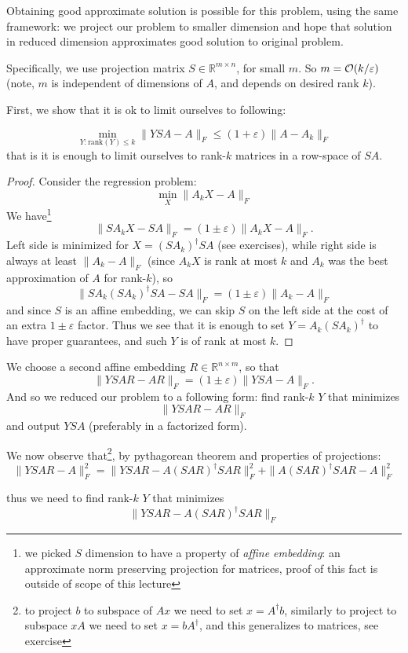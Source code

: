 \documentclass[11pt]{article}
\begin{document}
Obtaining good approximate solution is possible for this problem, using the same framework: we project our problem to smaller dimension and hope that solution in reduced dimension approximates good solution to original problem.

Specifically, we use projection matrix $S \in \mathbb{R}^{m \times n}$, for small $m$. So $m = \mathcal{O}(k/\varepsilon)$ (note, $m$ is independent of dimensions of $A$, and depends on desired rank $k$). 

First, we show that it is ok to limit ourselves to following:
\begin{theorem}
$$\min_{Y: \textrm{rank}(Y) \le k} \|YSA - A\|_F \le (1+\varepsilon)\|A-A_k\|_F$$
that is it is enough to limit ourselves to rank-$k$ matrices in a row-space of $SA$.
\end{theorem}
\begin{proof}
Consider the regression problem:
$$\min_{X} \|A_k X - A \|_F$$
We have\footnote{we picked $S$ dimension to have a property of \emph{affine embedding}: an approximate norm preserving projection for matrices, proof of this fact is outside of scope of this lecture}
$$\|SA_k X - SA \|_F = (1\pm \varepsilon)\|A_kX - A\|_F.$$
Left side is minimized for $X = (SA_k)^{\dagger} SA$ (see exercises), while right side is always at least $\|A_k - A\|_F$ (since $A_kX$ is rank at most $k$ and $A_k$ was the best approximation of $A$ for rank-$k$), so
$$\|SA_k (SA_k)^{\dagger} SA - SA\|_F = (1\pm \varepsilon) \|A_k - A \|_F$$
and since $S$ is an affine embedding, we can skip $S$ on the left side at the cost of an extra $1\pm\varepsilon$ factor.
Thus we see that it is enough to set $Y = A_k (SA_k)^{\dagger}$ to have proper guarantees, and such $Y$ is of rank at most $k$.
\end{proof}
We choose a second affine embedding $R \in \mathbb{R}^{n \times m}$, so that
$$\|YSAR - AR \|_F = (1\pm \varepsilon)\|YSA - A\|_F.$$
And so we reduced our problem to a following form: find rank-$k$ $Y$ that minimizes
$$\|YSAR - AR\|_F$$
and output $YSA$ (preferably in a factorized form).

We now observe that\footnote{to project $b$ to subspace of $Ax$ we need to set $x = A^{\dagger}b$, similarly to project to subspace $xA$ we need to set $x = bA^{\dagger}$, and this generalizes to matrices, see exercise}, by pythagorean theorem and properties of projections:
$$\|YSAR - A\|_F^2  = \|YSAR - A (SAR)^\dagger SAR\|_F^2 + \|A(SAR)^\dagger SAR - A\|_F^2$$

thus we need to find rank-$k$ $Y$ that minimizes
$$\|YSAR - A (SAR)^\dagger SAR\|_F$$
\end{document}
